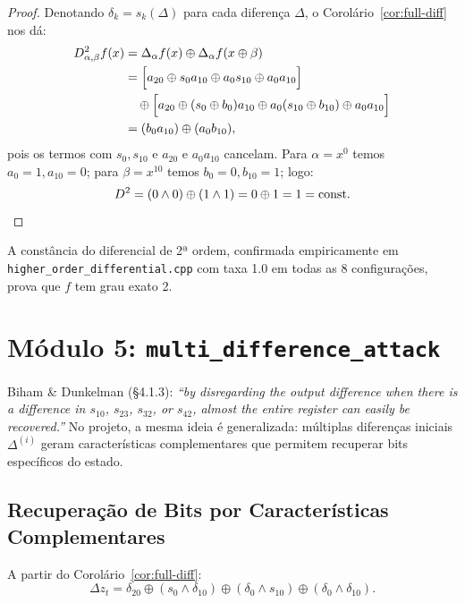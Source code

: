 \documentclass[12pt,a4paper]{article}
\theoremstyle{definition}
\theoremstyle{remark}
\newcommand{\xor}{\oplus}
\newcommand{\AND}{\wedge}
\newcommand{\filter}{f}
\newcommand{\ks}{z}
\begin{document}
\begin{proof}
  Denotando $\delta_k = s_k(\Delta)$ para cada diferença $\Delta$, o
  Corolário~\ref{cor:full-diff} nos dá:
  \begin{align*}
    D^2_{\alpha,\beta} \filter(x)
    &= \Delta_\alpha \filter(x) \xor \Delta_\alpha \filter(x \xor \beta) \\
    &= \Bigl[a_{20} \xor s_0 a_{10} \xor a_0 s_{10} \xor a_0 a_{10}\Bigr] \\
    &\quad \xor \Bigl[a_{20} \xor (s_0 \xor b_0) a_{10}
                       \xor a_0 (s_{10}\xor b_{10}) \xor a_0 a_{10}\Bigr] \\
    &= (b_0 a_{10}) \xor (a_0 b_{10}),
  \end{align*}
  pois os termos com $s_0, s_{10}$ e $a_{20}$ e $a_0 a_{10}$ cancelam.
  Para $\alpha = x^0$ temos $a_0 = 1, a_{10} = 0$; para $\beta = x^{10}$
  temos $b_0 = 0, b_{10} = 1$; logo:
  \[
    D^2 = (0 \AND 0) \xor (1 \AND 1) = 0 \xor 1 = 1 = \text{const.} \qedhere
  \]
\end{proof}

A constância do diferencial de 2ª ordem, confirmada empiricamente em
\texttt{higher\_order\_differential.cpp} com taxa 1.0 em todas as 8
configurações, prova que $\filter$ tem grau exato 2.

\section{Módulo 5: \texttt{multi\_difference\_attack}}
\label{sec:multi}

\begin{paperref}
  Biham \& Dunkelman (\S4.1.3): \textit{``by disregarding the output
  difference when there is a difference in $s_{10}$, $s_{23}$, $s_{32}$,
  or $s_{42}$, almost the entire register can easily be recovered.''}
  No projeto, a mesma ideia é generalizada: múltiplas diferenças iniciais
  $\Delta^{(i)}$ geram características complementares que permitem recuperar
  bits específicos do estado.
\end{paperref}

\subsection{Recuperação de Bits por Características Complementares}

A partir do Corolário~\ref{cor:full-diff}:
\[
  \Delta\ks_t = \delta_{20} \xor (s_0 \AND \delta_{10})
               \xor (\delta_0 \AND s_{10}) \xor (\delta_0 \AND \delta_{10}).
\]
\end{document}

